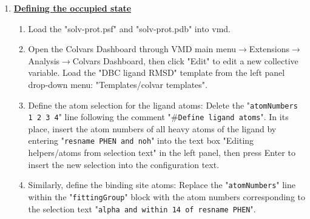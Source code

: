 \documentclass[9pt,tutorial]{livecoms}
\newcommand{\jh}[1]{\textcolor{blue}{JH: #1}}
\newcommand{\grace}[1]{\textcolor{red}{GB: #1}}
\newcommand{\Mina}[1]{\textcolor{magenta}{Mina: #1}}
\begin{document}
\begin{enumerate}[left=0pt .. \parindent]
     \item {\hyperref[sec:8.2]{\bf Defining the occupied state}}~
     \begin{enumerate}
     \item Load the "solv-prot.psf" and "solv-prot.pdb" into vmd.
     \item Open the Colvars Dashboard through VMD main menu$\rightarrow$Extensions$\rightarrow$Analysis$\rightarrow$Colvars Dashboard, then click "Edit" to edit a new collective variable.
Load the "DBC ligand RMSD" template from the left panel drop-down menu: "Templates/colvar templates".

     \item Define the atom selection for the ligand atoms:
Delete the "\texttt{atomNumbers 1 2 3 4}" line following the comment "\texttt{$\#$Define ligand atoms}".
In its place, insert the atom numbers of all heavy atoms of the ligand by entering "\texttt{resname PHEN and noh}" into the text box "Editing helpers/atoms from selection text" in the left panel, then press Enter to insert the new selection into the configuration text.

     \item Similarly, define the binding site atoms:
Replace the "\texttt{atomNumbers}" line within the "\texttt{fittingGroup}" block with the atom numbers corresponding to the selection text "\texttt{alpha and within 14 of resname PHEN}".



\end{enumerate}
\end{enumerate}
\end{document}

